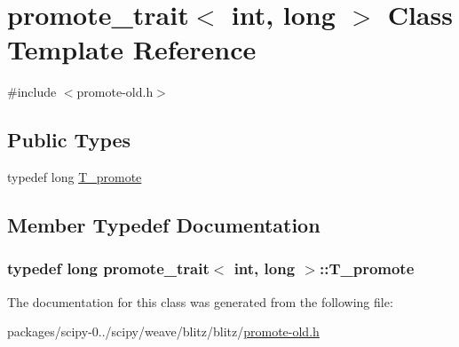\hypertarget{classpromote__trait_3_01int_00_01long_01_4}{}\section{promote\+\_\+trait$<$ int, long $>$ Class Template Reference}
\label{classpromote__trait_3_01int_00_01long_01_4}


{\ttfamily \#include $<$promote-\/old.\+h$>$}

\subsection*{Public Types}
\begin{DoxyCompactItemize}
\item 
typedef long \hyperlink{classpromote__trait_3_01int_00_01long_01_4_a6176ca3037b6fe9872e2fdc79f93b243}{T\+\_\+promote}
\end{DoxyCompactItemize}


\subsection{Member Typedef Documentation}
\hypertarget{classpromote__trait_3_01int_00_01long_01_4_a6176ca3037b6fe9872e2fdc79f93b243}{}
\subsubsection[{T\+\_\+promote}]{\setlength{\rightskip}{0pt plus 5cm}typedef long {\bf promote\+\_\+trait}$<$ int, long $>$\+::{\bf T\+\_\+promote}}\label{classpromote__trait_3_01int_00_01long_01_4_a6176ca3037b6fe9872e2fdc79f93b243}


The documentation for this class was generated from the following file\+:\begin{DoxyCompactItemize}
\item 
packages/scipy-\/0../scipy/weave/blitz/blitz/\hyperlink{promote-old_8h}{promote-\/old.\+h}\end{DoxyCompactItemize}
